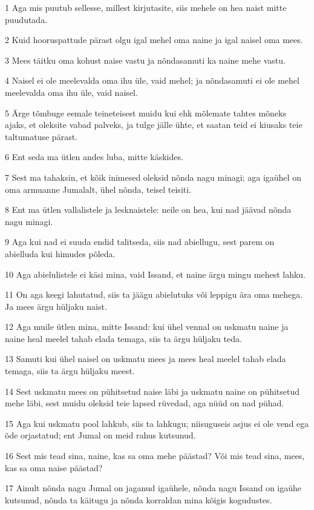 \par 1 Aga mis puutub sellesse, millest kirjutasite, siis mehele on hea naist mitte puudutada.
\par 2 Kuid hooruspattude pärast olgu igal mehel oma naine ja igal naisel oma mees.
\par 3 Mees täitku oma kohust naise vastu ja nõndasamuti ka naine mehe vastu.
\par 4 Naisel ei ole meelevalda oma ihu üle, vaid mehel; ja nõndasamuti ei ole mehel meelevalda oma ihu üle, vaid naisel.
\par 5 Ärge tõmbuge eemale teineteisest muidu kui ehk mõlemate tahtes mõneks ajaks, et oleksite vabad palveks, ja tulge jälle ühte, et saatan teid ei kiusaks teie taltumatuse pärast.
\par 6 Ent seda ma ütlen andes luba, mitte käskides.
\par 7 Sest ma tahaksin, et kõik inimesed oleksid nõnda nagu minagi; aga igaühel on oma armuanne Jumalalt, ühel nõnda, teisel teisiti.
\par 8 Ent ma ütlen vallalistele ja lesknaistele: neile on hea, kui nad jäävad nõnda nagu minagi.
\par 9 Aga kui nad ei suuda endid talitseda, siis nad abiellugu, sest parem on abielluda kui himudes põleda.
\par 10 Aga abielulistele ei käsi mina, vaid Issand, et naine ärgu mingu mehest lahku.
\par 11 On aga keegi lahutatud, siis ta jäägu abielutuks või leppigu ära oma mehega. Ja mees ärgu hüljaku naist.
\par 12 Aga muile ütlen mina, mitte Issand: kui ühel vennal on uskmatu naine ja naine heal meelel tahab elada temaga, siis ta ärgu hüljaku teda.
\par 13 Samuti kui ühel naisel on uskmatu mees ja mees heal meelel tahab elada temaga, siis ta ärgu hüljaku meest.
\par 14 Sest uskmatu mees on pühitsetud naise läbi ja uskmatu naine on pühitsetud mehe läbi, sest muidu oleksid teie lapsed rüvedad, aga nüüd on nad pühad.
\par 15 Aga kui uskmatu pool lahkub, siis ta lahkugu; niisuguseis asjus ei ole vend ega õde orjastatud; ent Jumal on meid rahus kutsunud.
\par 16 Sest mis tead sina, naine, kas sa oma mehe päästad? Või mis tead sina, mees, kas sa oma naise päästad?
\par 17 Ainult nõnda nagu Jumal on jaganud igaühele, nõnda nagu Issand on igaühe kutsunud, nõnda ta käitugu ja nõnda korraldan mina kõigis kogudustes.
